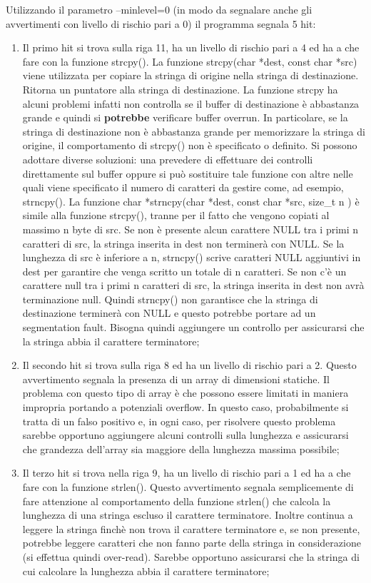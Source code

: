 \documentclass[11pt]{article} %
\begin{document}
Utilizzando il parametro --minlevel=0 (in modo da segnalare anche gli avvertimenti con livello di rischio pari a 0) il programma segnala 5 hit:
\begin{enumerate}
\item{Il primo hit si trova sulla riga 11, ha un livello di rischio pari a 4 ed ha a che fare con la funzione strcpy(). La funzione strcpy(char *dest, const char *src) viene utilizzata per copiare la stringa di origine nella stringa di destinazione. Ritorna un puntatore alla stringa di destinazione. La funzione strcpy ha alcuni problemi infatti non controlla se il buffer di destinazione è abbastanza grande e quindi si \textbf{potrebbe} verificare buffer overrun. In particolare, se la stringa di destinazione non è abbastanza grande per memorizzare la stringa di origine, il comportamento di strcpy() non è specificato o definito. \newline
Si possono adottare diverse soluzioni: una prevedere di effettuare dei controlli direttamente sul buffer oppure si può sostituire tale funzione con altre nelle quali viene specificato il numero di caratteri da gestire come, ad esempio, strncpy(). La funzione char *strncpy(char *dest, const char *src, size\_t n ) è simile alla funzione strcpy(), tranne per il fatto che vengono copiati al massimo n byte di src. Se non è presente alcun carattere NULL tra i primi n caratteri di src, la stringa inserita in dest non terminerà con NULL. Se la lunghezza di src è inferiore a n, strncpy() scrive caratteri NULL aggiuntivi in dest per garantire che venga scritto un totale di n caratteri. Se non c'è un carattere null tra i primi n caratteri di src, la stringa inserita in dest non avrà terminazione null. Quindi strncpy() non garantisce che la stringa di destinazione terminerà con NULL e questo potrebbe portare ad un segmentation fault. Bisogna quindi aggiungere un controllo per assicurarsi che la stringa abbia il carattere terminatore;}
\item{Il secondo hit si trova sulla riga 8 ed ha un livello di rischio pari a 2. Questo avvertimento segnala la presenza di un array di dimensioni statiche. Il problema con questo tipo di array è che possono essere limitati in maniera impropria portando a potenziali overflow. In questo caso, probabilmente si tratta di un falso positivo e, in ogni caso, per risolvere questo problema sarebbe opportuno aggiungere alcuni controlli sulla lunghezza e assicurarsi che grandezza dell'array sia maggiore della lunghezza massima possibile;}
\item{Il terzo hit si trova nella riga 9, ha un livello di rischio pari a 1 ed ha a che fare con la funzione strlen(). Questo avvertimento segnala semplicemente di fare attenzione al comportamento della funzione strlen() che calcola la lunghezza di una stringa escluso il carattere terminatore. Inoltre continua a leggere la stringa finchè non trova il carattere terminatore e, se non presente, potrebbe leggere caratteri che non fanno parte della stringa in considerazione (si effettua quindi over-read). Sarebbe opportuno assicurarsi che la stringa di cui calcolare la lunghezza abbia il carattere terminatore;}

\end{enumerate}
\end{document}
